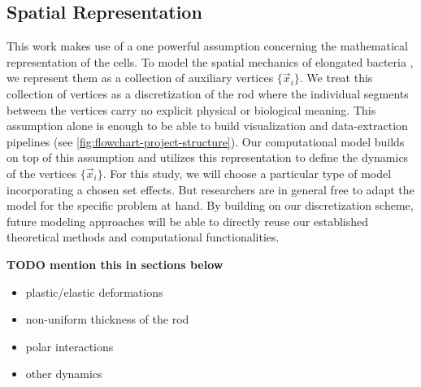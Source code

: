 \documentclass[10pt,letterpaper]{article}
\begin{document}
\subsection{Spatial Representation}
\label{subsec:spatial-representation}
This work makes use of a one powerful assumption concerning the mathematical representation of the
cells.
To model the spatial mechanics of elongated bacteria \cite{Billaudeau2017}, we represent them as a
collection of auxiliary vertices $\{\vec{x}_i\}$.
We treat this collection of vertices as a discretization of the rod where the individual segments
between the vertices carry no explicit physical or biological meaning.
This assumption alone is enough to be able to build visualization and data-extraction pipelines (see
\ref{fig:flowchart-project-structure}).
Our computational model builds on top of this assumption and utilizes this representation to
define the dynamics of the vertices $\{\vec{x}_i\}$.
For this study, we will choose a particular type of model incorporating a chosen set effects.
But researchers are in general free to adapt the model for the specific problem at hand.
By building on our discretization scheme, future modeling approaches will be able to directly reuse
our established theoretical methods and computational functionalities.

\textbf{TODO mention this in sections below}
\begin{itemize}
    \item plastic/elastic deformations
    \item non-uniform thickness of the rod
    \item polar interactions \cite{Duvernoy2018}
    \item other dynamics
\end{itemize}

\end{document}
